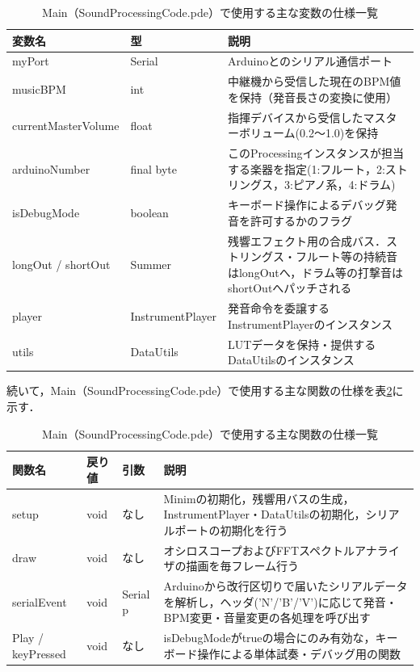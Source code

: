 \begin{table}[H]
    \caption{Main（SoundProcessingCode.pde）で使用する主な変数の仕様一覧}
    \centering
    \label{table:gakki_main_var}
    \begin{tabular}{p{3.9cm}p{3.4cm}p{6.2cm}}
    \hline
    \textbf{変数名} & \textbf{型} & \textbf{説明}\\
    \hline
    myPort & Serial & Arduinoとのシリアル通信ポート\\
    \hline
    musicBPM & int & 中継機から受信した現在のBPM値を保持（発音長さの変換に使用）\\
    \hline
    currentMasterVolume & float & 指揮デバイスから受信したマスターボリューム(0.2〜1.0)を保持\\
    \hline
    arduinoNumber & final byte & このProcessingインスタンスが担当する楽器を指定(1:フルート，2:ストリングス，3:ピアノ系，4:ドラム)\\
    \hline
    isDebugMode & boolean & キーボード操作によるデバッグ発音を許可するかのフラグ\\
    \hline
    longOut / shortOut & Summer & 残響エフェクト用の合成バス．ストリングス・フルート等の持続音はlongOutへ，ドラム等の打撃音はshortOutへパッチされる\\
    \hline
    player & InstrumentPlayer & 発音命令を委譲するInstrumentPlayerのインスタンス\\
    \hline
    utils & DataUtils & LUTデータを保持・提供するDataUtilsのインスタンス\\
    \hline
    \end{tabular}
\end{table}

続いて，Main（SoundProcessingCode.pde）で使用する主な関数の仕様を表\ref{table:gakki_main_func}に示す．

\begin{table}[H]
    \caption{Main（SoundProcessingCode.pde）で使用する主な関数の仕様一覧}
    \centering
    \label{table:gakki_main_func}
    \begin{tabular}{p{2.8cm}p{1.6cm}p{2.8cm}p{6.3cm}}
    \hline
    \textbf{関数名} & \textbf{戻り値} & \textbf{引数} & \textbf{説明}\\
    \hline
    setup & void & なし & Minimの初期化，残響用バスの生成，InstrumentPlayer・DataUtilsの初期化，シリアルポートの初期化を行う\\
    \hline
    draw & void & なし & オシロスコープおよびFFTスペクトルアナライザの描画を毎フレーム行う\\
    \hline
    serialEvent & void & Serial p & Arduinoから改行区切りで届いたシリアルデータを解析し，ヘッダ('N'/'B'/'V')に応じて発音・BPM変更・音量変更の各処理を呼び出す\\
    \hline
    Play / keyPressed & void & なし & isDebugModeがtrueの場合にのみ有効な，キーボード操作による単体試奏・デバッグ用の関数\\
    \hline
    \end{tabular}
\end{table}

